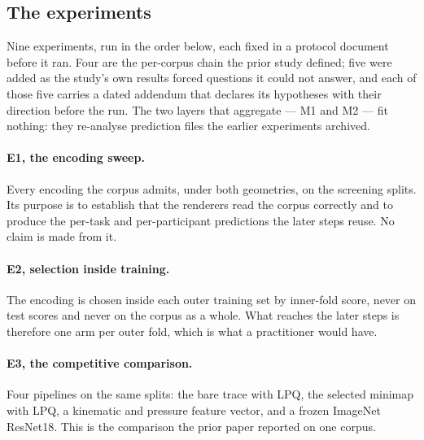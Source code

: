 
\subsection{The experiments}
\label{sec:experiments}

Nine experiments, run in the order below, each fixed in a protocol document before it ran. Four are
the per-corpus chain the prior study defined; five were added as the study's own results forced
questions it could not answer, and each of those five carries a dated addendum that declares its
hypotheses with their direction before the run. The two layers that aggregate --- M1 and M2 ---
fit nothing: they re-analyse prediction files the earlier experiments archived.

\paragraph{E1, the encoding sweep.} Every encoding the corpus admits, under both geometries, on the
screening splits. Its purpose is to establish that the renderers read the corpus correctly and to
produce the per-task and per-participant predictions the later steps reuse. No claim is made from
it.

\paragraph{E2, selection inside training.} The encoding is chosen inside each outer training set by
inner-fold score, never on test scores and never on the corpus as a whole. What reaches the later
steps is therefore one arm per outer fold, which is what a practitioner would have.

\paragraph{E3, the competitive comparison.} Four pipelines on the same splits: the bare trace with
LPQ, the selected minimap with LPQ, a kinematic and pressure feature vector, and a frozen ImageNet
ResNet18. This is the comparison the prior paper reported on one corpus.

